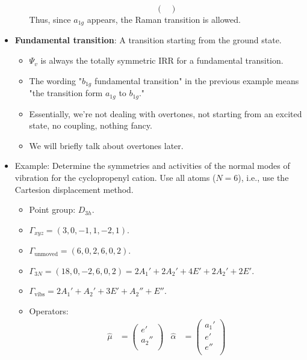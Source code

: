 \documentclass[../notes.tex]{subfiles}
\begin{document}
\begin{itemize}
\begin{itemize}
\begin{equation*}
\begin{pmatrix}
            \end{pmatrix}
        \end{equation*}
        Thus, since $a_{1g}$ appears, the Raman transition is allowed.
    \end{itemize}
    \item \textbf{Fundamental transition}: A transition starting from the ground state.
    \begin{itemize}
        \item $\Psi_v$ is always the totally symmetric IRR for a fundamental transition.
        \item The wording "$b_{1g}$ fundamental transition" in the previous example means "the transition form $a_{1g}$ to $b_{1g}$."
        \item Essentially, we're not dealing with overtones, not starting from an excited state, no coupling, nothing fancy.
        \item We will briefly talk about overtones later.
    \end{itemize}
    \item Example: Determine the symmetries and activities of the normal modes of vibration for the cyclopropenyl cation. Use all atoms ($N=6$), i.e., use the Cartesion displacement method.
    \begin{itemize}
        \item Point group: $D_{3h}$.
        \item $\Gamma_{xyz}=(3,0,-1,1,-2,1)$.
        \item $\Gamma_\text{unmoved}=(6,0,2,6,0,2)$.
        \item $\Gamma_{3N}=(18,0,-2,6,0,2)=2A_1'+2A_2'+4E'+2A_2'+2E'$.
        \item $\Gamma_\text{vibs}=2A_1'+A_2'+3E'+A_2''+E''$.
        \item Operators:
        \begin{align*}
            \hat{\mu} &=
            \begin{pmatrix}
                e'\\
                a_2''\\
            \end{pmatrix}&
            \hat{\alpha} &=
            \begin{pmatrix}
                a_1'\\
                e'\\
                e''\\
            \end{pmatrix}
        \end{align*}

\end{itemize}
\end{itemize}
\end{document}
